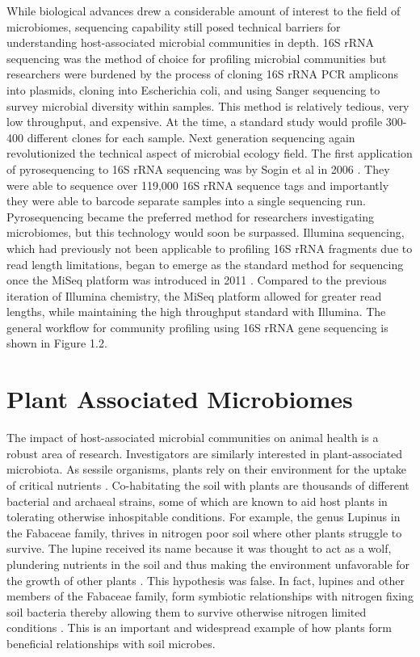 While biological advances drew a considerable amount of interest to the field of microbiomes, sequencing capability still posed technical barriers for understanding host-associated microbial communities in depth. 16S rRNA sequencing was the method of choice for profiling microbial communities but researchers were burdened by the process of cloning 16S rRNA PCR amplicons into plasmids, cloning into Escherichia coli, and using Sanger sequencing to survey microbial diversity within samples. This method is relatively tedious, very low throughput, and expensive. At the time, a standard study would profile 300-400 different clones for each sample. Next generation sequencing again revolutionized the technical aspect of microbial ecology field. The first application of pyrosequencing to 16S rRNA sequencing was by Sogin et al in 2006 \cite{Sogin2006}. They were able to sequence over 119,000 16S rRNA sequence tags and importantly they were able to barcode separate samples into a single sequencing run. Pyrosequencing became the preferred method for researchers investigating microbiomes, but this technology would soon be surpassed. Illumina sequencing, which had previously not been applicable to profiling 16S rRNA fragments due to read length limitations, began to emerge as the standard method for sequencing once the MiSeq platform was introduced in 2011 \cite{Caporaso2011}. Compared to the previous iteration of Illumina chemistry, the MiSeq platform allowed for greater read lengths, while maintaining the high throughput standard with Illumina. The general workflow for community profiling using 16S rRNA gene sequencing is shown in Figure 1.2.

\section{Plant Associated Microbiomes}
%
The impact of host-associated microbial communities on animal health is a robust area of research. Investigators are similarly interested in plant-associated microbiota. As sessile organisms, plants rely on their environment for the uptake of critical nutrients \cite{Epstein1971}. Co-habitating the soil with plants are thousands of different bacterial and archaeal strains, some of which are known to aid host plants in tolerating otherwise inhospitable conditions. For example, the genus Lupinus in the Fabaceae family, thrives in nitrogen poor soil where other plants struggle to survive. The lupine received its name because it was thought to act as a wolf, plundering nutrients in the soil and thus making the environment unfavorable for the growth of other plants \cite{Austin2004}. This hypothesis was false. In fact, lupines and other members of the Fabaceae family, form symbiotic relationships with nitrogen fixing soil bacteria thereby allowing them to survive otherwise nitrogen limited conditions \cite{Vance2001}. This is an important and widespread example of how plants form beneficial relationships with soil microbes.
	
